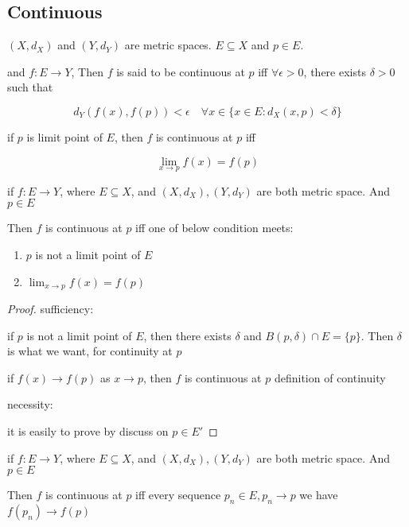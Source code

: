 \subsection{Continuous}

\begin{definition}
    $(X,d_X)$ and $(Y,d_Y)$  are metric spaces. $E \subseteq X$ and $p \in E$.

    and $f:E \to Y$, Then $f$ is said to be continuous at $p$ iff $\forall \epsilon > 0$, 
    there exists $\delta > 0$ such that

    \[
        d_Y(f(x), f(p)) < \epsilon \quad \forall x \in \{x \in E: d_X(x,p) < \delta \}
    \]
\end{definition}

\begin{corollary}
    if $p$ is limit point of $E$, then $f$ is continuous at $p$ iff

    \[
        \lim_{x \to p}f(x) = f(p)
    \]
\end{corollary}

\begin{thm}
    if $f: E \to Y$, where $E \subseteq X$, and $(X, d_X), (Y, d_Y)$ are both metric space. 
    And $p \in E$

    Then $f$ is continuous at $p$ iff one of below condition meets:

    \begin{enumerate}
        \item $p$ is not a limit point of $E$

        \item $\lim_{x \to p}f(x) = f(p)$
    \end{enumerate}
\end{thm}

\begin{proof}
    sufficiency:

    if $p$ is not a limit point of $E$, then there exists $\delta$ and $B(p, \delta) \cap E = \{ p \}$.
    Then $\delta$ is what we want, for continuity at $p$

    if $f(x) \to f(p)$ as $x \to p$, then $f$ is continuous at $p$ definition of continuity 

    necessity:

    it is easily to prove by discuss on $p \in E'$
\end{proof}

\begin{thm}
    \label{thm:4-2-4}
    if $f: E \to Y$, where $E \subseteq X$, and $(X, d_X), (Y, d_Y)$ are both metric space. 
    And $p \in E$

    Then $f$ is continuous at $p$ iff every sequence $p_n \in E, p_n \to p$ we have $f(p_n) \to f(p)$
\end{thm}

